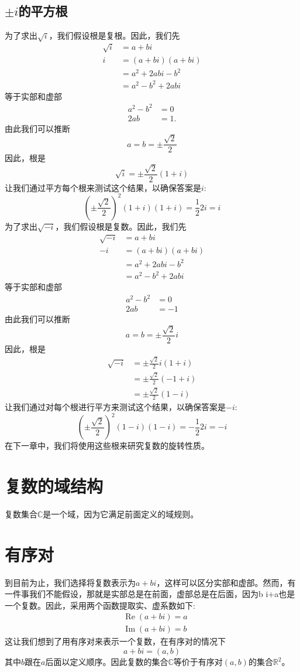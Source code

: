 \subsection{\boldmath $\pm i$的平方根}
为了求出$\sqrt{i}$，我们假设根是复根。因此，我们先
$$
\begin{aligned}
\sqrt{i} & =a+b i \\
i & =(a+b i)(a+b i) \\
& =a^{2}+2 a b i-b^{2} \\
& =a^{2}-b^{2}+2 a b i
\end{aligned}
$$
等于实部和虚部
$$
\begin{aligned}
a^{2}-b^{2} & =0 \\
2 a b & =1 .
\end{aligned}
$$
由此我们可以推断
$$
a=b= \pm \frac{\sqrt{2}}{2}
$$
因此，根是
$$
\sqrt{i}= \pm \frac{\sqrt{2}}{2}(1+i)
$$
让我们通过平方每个根来测试这个结果，以确保答案是$i$:
$$
\left( \pm \frac{\sqrt{2}}{2}\right)^{2}(1+i)(1+i)=\frac{1}{2} 2 i=i
$$
为了求出$\sqrt{-i}$，我们假设根是复数。因此，我们先
$$
\begin{aligned}
\sqrt{-i} & =a+b i \\
-i & =(a+b i)(a+b i) \\
& =a^{2}+2 a b i-b^{2} \\
& =a^{2}-b^{2}+2 a b i
\end{aligned}
$$
等于实部和虚部
$$
\begin{aligned}
a^{2}-b^{2} & =0 \\
2 a b & =-1
\end{aligned}
$$
由此我们可以推断
$$
a=b= \pm \frac{\sqrt{2}}{2} i
$$
因此，根是
$$
\begin{aligned}
\sqrt{-i} & = \pm \frac{\sqrt{2}}{2} i(1+i) \\
& = \pm \frac{\sqrt{2}}{2}(-1+i) \\
& = \pm \frac{\sqrt{2}}{2}(1-i)
\end{aligned}
$$
让我们通过对每个根进行平方来测试这个结果，以确保答案是$-i$:
$$
\left( \pm \frac{\sqrt{2}}{2}\right)^{2}(1-i)(1-i)=-\frac{1}{2} 2 i=-i
$$
在下一章中，我们将使用这些根来研究复数的旋转性质。

\section{复数的域结构}
复数集合$\mathbb{C}$是一个域，因为它满足前面定义的域规则。

\section{有序对}
到目前为止，我们选择将复数表示为$a+b i$，这样可以区分实部和虚部。然而，有一件事我们不能假设，那就是实部总是在前面，虚部总是在后面，因为b i+a也是一个复数。因此，采用两个函数提取实、虚系数如下:
$$
\begin{aligned}
& \operatorname{Re}(a+b i)=a \\
& \operatorname{Im}(a+b i)=b
\end{aligned}
$$
这让我们想到了用有序对来表示一个复数，在有序对的情况下
$$
a+b i=(a, b)
$$
其中$b$跟在$a$后面以定义顺序。因此复数的集合$\mathbb{C}$等价于有序对$(a, b)$的集合$\mathbb{R}^{2}$。

